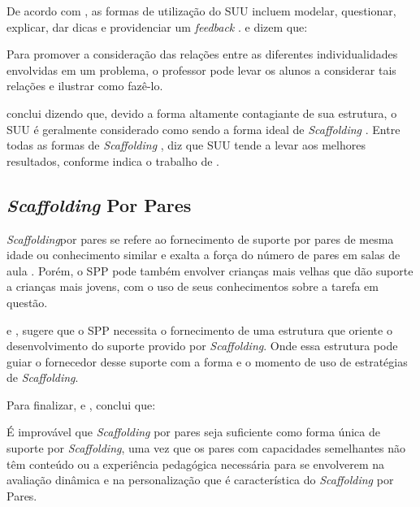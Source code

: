 De acordo com , as formas de utilização do SUU incluem modelar, questionar, explicar, dar dicas e providenciar um \textit{feedback} \cite{vanPol2010}.  e  dizem que: 

\begin{quoting}[leftmargin=4cm, rightmargin=0cm]
\noindent Para promover a consideração das relações entre as diferentes individualidades envolvidas em um problema, o professor pode levar os alunos a considerar tais relações e ilustrar como fazê-lo. 
\end{quoting}

 conclui dizendo que, devido a forma altamente contagiante de sua estrutura, o SUU é geralmente considerado como sendo a forma ideal de \textit{Scaffolding} \cite{Chi1996,Graesser1997,Belland2015}. Entre todas as formas de \textit{Scaffolding} ,  diz que SUU tende a levar aos melhores resultados, conforme indica o trabalho de .  
\subsection{\textit{Scaffolding} Por Pares }

\textit{Scaffolding}por pares se refere ao fornecimento de suporte por pares de mesma idade ou conhecimento similar e exalta a força do número de pares em salas de aula \cite{Pata2006,Davin2013,Sabet2013,Belland2017}. Porém, o SPP pode também envolver crianças mais velhas que dão suporte a crianças mais jovens, com o uso de seus conhecimentos sobre a tarefa em questão. 

 e  , sugere que o SPP necessita o fornecimento de uma estrutura que oriente o desenvolvimento do suporte provido por \textit{Scaffolding}. Onde essa estrutura pode guiar o fornecedor desse suporte com a forma e o momento de uso de estratégias de \textit{Scaffolding}.

Para finalizar,  e  , conclui que: 

\begin{quoting}[leftmargin=4cm, rightmargin=0cm]
\noindent É improvável que \textit{Scaffolding} por pares seja suficiente como forma única de suporte por \textit{Scaffolding}, uma vez que os pares com capacidades semelhantes não têm conteúdo ou a experiência pedagógica necessária para se envolverem na avaliação dinâmica e na personalização que é característica do \textit{Scaffolding} por Pares. 
\end{quoting}
